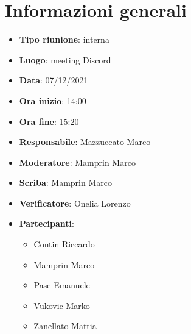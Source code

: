 \section{Informazioni generali}
\begin{itemize}
  \item \textbf{Tipo riunione}: interna
  \item \textbf{Luogo}: meeting Discord
  \item \textbf{Data}: 07/12/2021
  \item \textbf{Ora inizio}: 14:00
  \item \textbf{Ora fine}: 15:20
  \item \textbf{Responsabile}: Mazzuccato Marco
  \item \textbf{Moderatore}: Mamprin Marco
  \item \textbf{Scriba}: Mamprin Marco
  \item \textbf{Verificatore}: Onelia Lorenzo
  \item \textbf{Partecipanti}:
  \begin{itemize}
    \item Contin Riccardo
    \item Mamprin Marco
    \item Pase Emanuele
    \item Vukovic Marko
    \item Zanellato Mattia
  \end{itemize}
\end{itemize}
